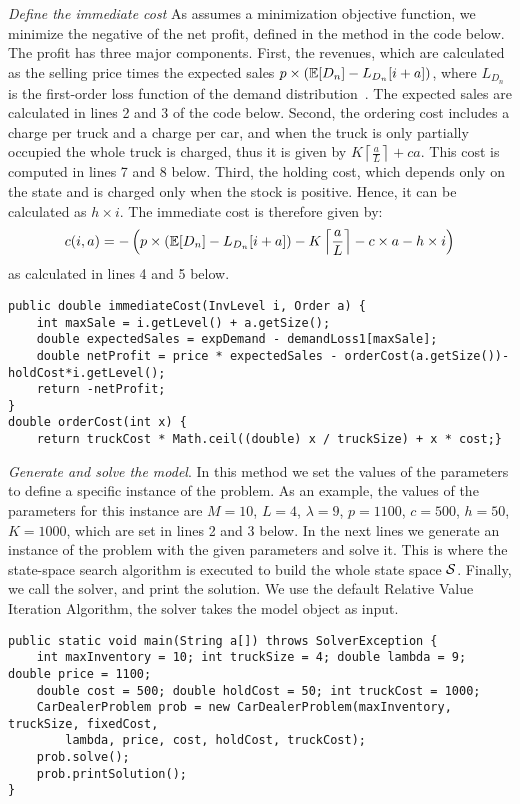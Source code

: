 \emph{Define the immediate cost}
As \jMDP assumes a minimization objective function, we minimize the negative of
the net profit, defined in the method  in the code below.
The profit has three major components. First, the revenues, which are
calculated as the selling price times the expected sales $p \times
(\E[D_n]-L_{D_n}[i+a])$, where $L_{D_n}$ is the first-order loss function of
the demand distribution~\cite{zipk00}. The expected sales are calculated in
lines 2 and 3 of the code below. Second, the ordering cost includes a charge
per truck and a charge per car, and when the truck is only partially occupied
the whole truck is charged, thus it is given by $K\left\lceil
\frac{a}{L}\right\rceil+ca$. This cost is computed in lines 7 and 8 below.
Third, the holding cost, which depends only on the state and is charged only
when the stock is positive. Hence, it can be calculated as $h \times i$. The
immediate cost is therefore given by:
  \[c(i,a)= -\left(p \times (\E[D_n]-L_{D_n}[i+a])-K\left\lceil \frac{a}{L}\right\rceil-c\times a -h\times i \right)\]
  as calculated in lines 4 and 5 below.
\begin{lstlisting}
public double immediateCost(InvLevel i, Order a) {
	int maxSale = i.getLevel() + a.getSize();
	double expectedSales = expDemand - demandLoss1[maxSale];
	double netProfit = price * expectedSales - orderCost(a.getSize())- holdCost*i.getLevel();
	return -netProfit;
}
double orderCost(int x) {
	return truckCost * Math.ceil((double) x / truckSize) + x * cost;}
\end{lstlisting}

\emph{Generate and solve the model}. In this method we set the values of the
parameters to define a specific instance of the problem. As an example, the
values of the parameters for this instance are $M=10$, $L=4$, $\lambda = 9$,
$p=1100$, $c=500$, $h=50$, $K=1000$, which are set in lines 2 and 3 below. In
the next lines we generate an instance of the problem with the given parameters
and solve it. This is where the state-space search algorithm is executed to
build the whole state space $\mS$.  
Finally, we call the solver, and print the solution. We use the default
Relative Value Iteration Algorithm, the solver takes the model object as input.

\begin{lstlisting}
public static void main(String a[]) throws SolverException {
	int maxInventory = 10; int truckSize = 4; double lambda = 9; double price = 1100; 
	double cost = 500; double holdCost = 50; int truckCost = 1000;
	CarDealerProblem prob = new CarDealerProblem(maxInventory, truckSize, fixedCost, 
		lambda, price, cost, holdCost, truckCost);
	prob.solve();
	prob.printSolution();
}
\end{lstlisting}

